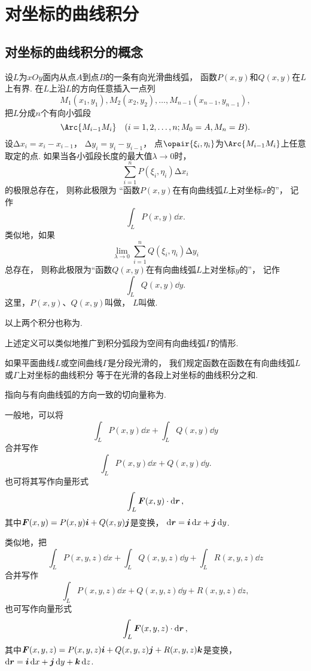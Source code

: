 \section{对坐标的曲线积分}
\subsection{对坐标的曲线积分的概念}
\begin{definition}
设\(L\)为\(xOy\)面内从点\(A\)到点\(B\)的一条有向光滑曲线弧，
函数\(P(x,y)\)和\(Q(x,y)\)在\(L\)上有界.
在\(L\)上沿\(L\)的方向任意插入一点列\[
	M_1(x_1,y_1),
	M_2(x_2,y_2),
	\dotsc,
	M_{n-1}(x_{n-1},y_{n-1}),
\]
把\(L\)分成\(n\)个有向小弧段\[
	\Arc{M_{i-1} M_i} \quad (i=1,2,\dotsc,n; M_0 = A, M_n = B).
\]
设\(\increment x_i = x_i - x_{i-1}\)，
\(\increment y_i = y_i - y_{i-1}\)，
点\(\opair{\xi_i,\eta_i}\)为\(\Arc{M_{i-1} M_i}\)上任意取定的点.
如果当各小弧段长度的最大值\(\lambda\to0\)时，\[
	\sum_{i=1}^n P(\xi_i,\eta_i) \increment x_i
\]的极限总存在，
则称此极限为
“函数\(P(x,y)\)在有向曲线弧\(L\)上对坐标\(x\)的”，
记作\[
	\int_L P(x,y) \dd{x}.
\]
类似地，如果\[
	\lim_{\lambda\to0} \sum_{i=1}^n Q(\xi_i,\eta_i) \increment y_i
\]总存在，
则称此极限为“函数\(Q(x,y)\)在有向曲线弧\(L\)上对坐标\(y\)的”，
记作\[
	\int_L Q(x,y) \dd{y}.
\]
这里，\(P(x,y)\)、\(Q(x,y)\)叫做，
\(L\)叫做.
\end{definition}
以上两个积分也称为.

上述定义可以类似地推广到积分弧段为空间有向曲线弧\(\Gamma\)的情形.

如果平面曲线\(L\)或空间曲线\(\Gamma\)是分段光滑的，
我们规定函数在函数在有向曲线弧\(L\)或\(\Gamma\)上对坐标的曲线积分
等于在光滑的各段上对坐标的曲线积分之和.

指向与有向曲线弧的方向一致的切向量称为.

一般地，可以将\[
	\int_L P(x,y) \dd{x} + \int_L Q(x,y) \dd{y}
\]合并写作\[
	\int_L P(x,y) \dd{x} + Q(x,y) \dd{y}.
\]
也可将其写作向量形式\[
	\int_L \boldsymbol{F}(x,y) \cdot \dd{\boldsymbol{r}},
\]
其中\(\boldsymbol{F}(x,y) = P(x,y) \boldsymbol{i} + Q(x,y) \boldsymbol{j}\)是变换，
\(\dd{\boldsymbol{r}} = \boldsymbol{i} \dd{x} + \boldsymbol{j} \dd{y}\).

类似地，把\[
	\int_L P(x,y,z) \dd{x} + \int_L Q(x,y,z) \dd{y} + \int_L R(x,y,z) \dd{z}
\]合并写作\[
	\int_L P(x,y,z) \dd{x} + Q(x,y,z) \dd{y} + R(x,y,z) \dd{z},
\]
也可写作向量形式\[
	\int_L \boldsymbol{F}(x,y,z) \cdot \dd{\boldsymbol{r}},
\]
其中\(\boldsymbol{F}(x,y,z) = P(x,y,z)\boldsymbol{i} + Q(x,y,z)\boldsymbol{j} + R(x,y,z)\boldsymbol{k}\)是变换，
\(\dd{\boldsymbol{r}} = \boldsymbol{i} \dd{x} + \boldsymbol{j} \dd{y} + \boldsymbol{k} \dd{z}\).

